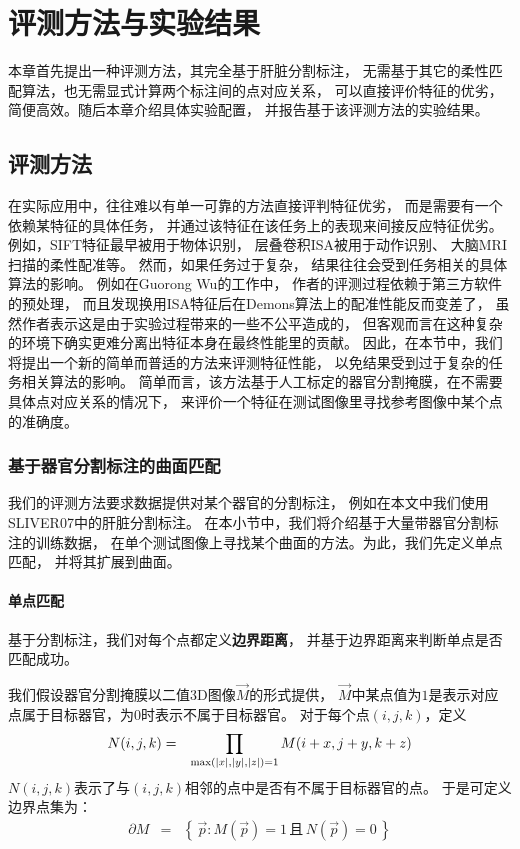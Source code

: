 
\chapter{评测方法与实验结果}
本章首先提出一种评测方法，其完全基于肝脏分割标注，
无需基于其它的柔性匹配算法，也无需显式计算两个标注间的点对应关系，
可以直接评价特征的优劣，简便高效。随后本章介绍具体实验配置，
并报告基于该评测方法的实验结果。

\section{评测方法}
在实际应用中，往往难以有单一可靠的方法直接评判特征优劣，
而是需要有一个依赖某特征的具体任务，
并通过该特征在该任务上的表现来间接反应特征优劣。
例如，SIFT特征最早被用于物体识别\cite{lowe1999object}，
层叠卷积ISA被用于动作识别\cite{le2011learning}、
大脑MRI扫描的柔性配准\cite{wu2013unsupervised}等。
然而，如果任务过于复杂，
结果往往会受到任务相关的具体算法的影响。
例如在Guorong Wu的工作\cite{wu2013unsupervised}中，
作者的评测过程依赖于第三方软件的预处理，
而且发现换用ISA特征后在Demons算法上的配准性能反而变差了，
虽然作者表示这是由于实验过程带来的一些不公平造成的，
但客观而言在这种复杂的环境下确实更难分离出特征本身在最终性能里的贡献。
因此，在本节中，我们将提出一个新的简单而普适的方法来评测特征性能，
以免结果受到过于复杂的任务相关算法的影响。
简单而言，该方法基于人工标定的器官分割掩膜，在不需要具体点对应关系的情况下，
来评价一个特征在测试图像里寻找参考图像中某个点的准确度。

\subsection{基于器官分割标注的曲面匹配}
我们的评测方法要求数据提供对某个器官的分割标注，
例如在本文中我们使用SLIVER07中的肝脏分割标注。
在本小节中，我们将介绍基于大量带器官分割标注的训练数据，
在单个测试图像上寻找某个曲面的方法。为此，我们先定义单点匹配，
并将其扩展到曲面。

\subsubsection{单点匹配}
基于分割标注，我们对每个点都定义{\bf 边界距离}，
并基于边界距离来判断单点是否匹配成功。

我们假设器官分割掩膜以二值3D图像$\vec{M}$的形式提供，
$\vec{M}$中某点值为$1$是表示对应点属于目标器官，为$0$时表示不属于目标器官。
对于每个点$(i, j, k)$，定义
\begin{eqnarray}
    N(i, j, k) &=& \prod_{
        \max(\left|x\right|, \left|y\right|, \left|z\right|) = 1}
        M(i + x, j + y, k + z)
\end{eqnarray}
$N(i, j, k)$表示了与$(i, j, k)$相邻的点中是否有不属于目标器官的点。
于是可定义边界点集为：
\begin{eqnarray}
    \partial M &=& \left\{\,\vec{p} : M(\vec{p}) = 1\,\text{且}\,
        N(\vec{p}) = 0\,\right\}
\end{eqnarray}

